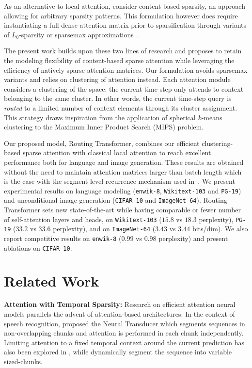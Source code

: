 \documentclass[a4paper]{article}
\begin{document}
As an alternative to local attention, \citet{correia2019adaptively} 
consider content-based sparsity, an approach allowing for arbitrary 
sparsity patterns. This formulation however does require instantiating a full 
dense attention matrix prior to sparsification through variants of \(L_0\)-sparsity 
or sparsemax approximations~\citep{blondel2019Fenchel}.

The present work builds upon these two lines of research and proposes to retain 
the modeling flexibility of content-based sparse attention while
leveraging the efficiency of natively sparse attention matrices.
Our formulation avoids sparsemax variants and relies on clustering of attention 
instead. Each attention module considers a clustering of the space: the
current time-step only attends to context belonging to the same cluster.
In other words, the current time-step query is \emph{routed} to a limited
number of context elements through its cluster assignment. This strategy draws inspiration
from the application of spherical \(k\)-means clustering to the Maximum Inner
Product Search (MIPS) problem.

Our proposed model, Routing Transformer, combines our efficient clustering-based 
sparse attention with classical local attention to reach excellent performance 
both for language and image generation. These results are obtained without the 
need to maintain attention matrices larger than batch length which is the case 
with the segment level recurrence mechanism used in~\citet{dai2019transformer,
sukhbaatar2019adaptive}. 
We present experimental results on language modeling 
(\texttt{enwik-8}, \texttt{Wikitext-103} and \texttt{PG-19}) and unconditional image generation (\texttt{CIFAR-10} and \texttt{ImageNet-64}). 
Routing Transformer sets new state-of-the-art while having comparable or fewer 
number of self-attention layers and heads, on 
\texttt{Wikitext-103} ($15.8$ vs $18.3$ perplexity),
\texttt{PG-19} (\(33.2\) vs \(33.6\) perplexity),
and on \texttt{ImageNet-64} ($3.43$ vs $3.44$ bits/dim). We also report
competitive results on \texttt{enwik-8} ($0.99$ vs $0.98$ perplexity)
and present ablations on \texttt{CIFAR-10}.

\section{Related Work}

{\bf Attention with Temporal Sparsity:} 
Research on efficient attention neural models parallels the advent of
attention-based architectures.
In the context of speech recognition, \citet{jaitly2016online} proposed the 
Neural Transducer which segments sequences in non-overlapping chunks and 
attention is performed in each chunk independently. Limiting attention to a 
fixed temporal context around the current prediction has also been explored in
\citet{chorowski2015attention}, while \citet{chiu2018monotonic} dynamically 
segment the sequence into variable sized-chunks.
\end{document}
